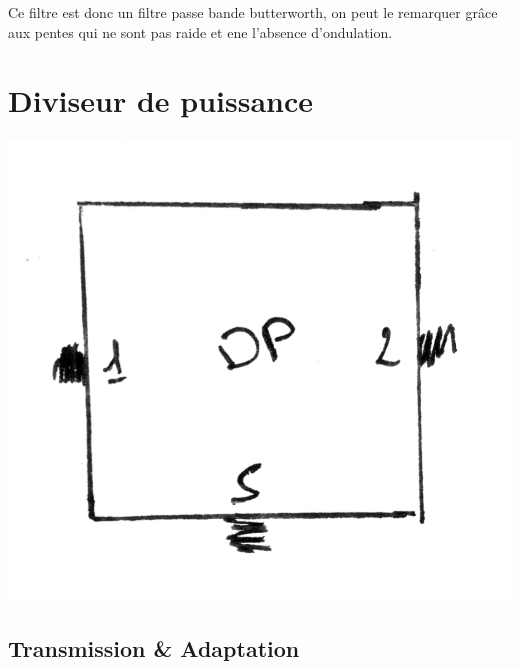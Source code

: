 \documentclass[a4paper,12pt]{report}            %
\begin{document}
Ce filtre est donc un filtre passe bande butterworth, on peut le remarquer grâce aux pentes 
qui ne sont pas raide et ene l'absence d'ondulation. 


\chapter{Diviseur de puissance}

\begin{center}\includegraphics[scale = 0.2]{pic/DP.png}\\ \end{center}

\section{Transmission \& Adaptation}
\end{document}
